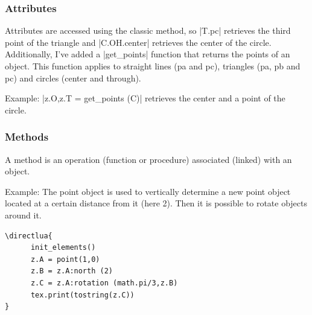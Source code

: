  \vspace{1em}

 \subsubsection{Attributes} %
 \label{ssub:attributes}
 Attributes are accessed using the classic method, so |T.pc| retrieves the third point  of the triangle and |C.OH.center| retrieves the center of the circle.  Additionally, I've added  a |get_points| function that returns the points of an object. This function applies to straight lines (pa and pc), triangles (pa, pb and pc) and circles (center and through).

  \vspace{1em}
  Example: |z.O,z.T = get_points (C)| retrieves the center and a point of the circle.

\subsubsection{Methods} %
\label{ssub:methods}

A method is an operation (function or procedure) associated (linked) with an object.

Example:   The point object is used to vertically determine a new point object located at a certain distance from it (here 2). Then it is possible to rotate objects around it.

\begin{Verbatim}
\directlua{
      init_elements()
      z.A = point(1,0)
      z.B = z.A:north (2)             
      z.C = z.A:rotation (math.pi/3,z.B)
      tex.print(tostring(z.C))
}
\end{Verbatim}



\endinput
